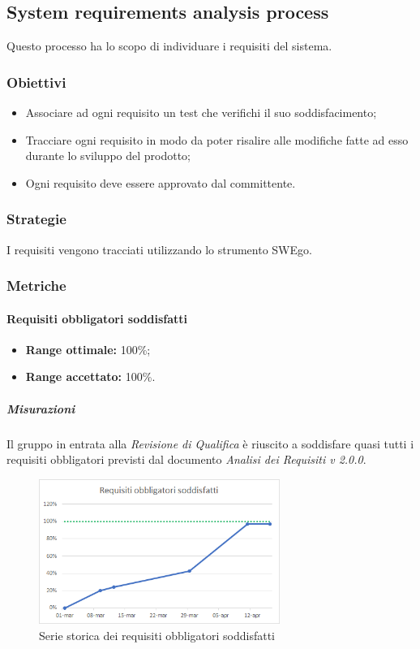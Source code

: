 \subsection{System requirements analysis process}
Questo processo ha lo scopo di individuare i requisiti del sistema.
\subsubsection{Obiettivi}
\begin{itemize}
	\item Associare ad ogni requisito un test che verifichi il suo soddisfacimento; 
	\item Tracciare ogni requisito in modo da poter risalire alle modifiche fatte ad esso durante lo sviluppo del prodotto;
	\item Ogni requisito deve essere approvato dal committente.
\end{itemize}
\subsubsection{Strategie}
I requisiti vengono tracciati utilizzando lo strumento SWEgo.
\subsubsection{Metriche}
\paragraph{Requisiti obbligatori soddisfatti} \Spazio
\begin{itemize}
	\item \textbf{Range ottimale:} 100\%;
	\item \textbf{Range accettato:} 100\%.
\end{itemize}
\subparagraph{Misurazioni}
Il gruppo in entrata alla \emph{Revisione di Qualifica} è riuscito a soddisfare quasi tutti i requisiti obbligatori previsti dal documento \textit{Analisi dei Requisiti v 2.0.0}.
\begin{figure}[H]
	\centering 
	\includegraphics[width=0.7\textwidth]{Images/obbl.png}
	\caption{Serie storica dei requisiti obbligatori soddisfatti}
	\label{obbl} 
\end{figure}


